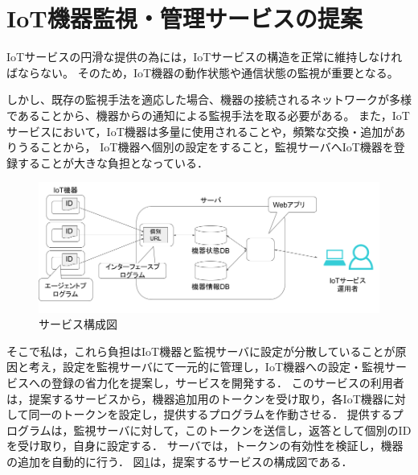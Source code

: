 \section{IoT機器監視・管理サービスの提案}
IoTサービスの円滑な提供の為には，IoTサービスの構造を正常に維持しなければならない。
そのため，IoT機器の動作状態や通信状態の監視が重要となる。

しかし、既存の監視手法を適応した場合、機器の接続されるネットワークが多様であることから、機器からの通知による監視手法を取る必要がある。
また，IoTサービスにおいて，IoT機器は多量に使用されることや，頻繁な交換・追加がありうることから，
IoT機器へ個別の設定をすること，監視サーバへIoT機器を登録することが大きな負担となっている．
\medskip

\begin{figure}[htbp]
\includegraphics[width=16cm]{images/prop_diag.png}
\caption{サービス構成図}
\label{fig:prop_diag}
\end{figure}
そこで私は，これら負担はIoT機器と監視サーバに設定が分散していることが原因と考え，設定を監視サーバにて一元的に管理し，IoT機器への設定・監視サービスへの登録の省力化を提案し，サービスを開発する．
このサービスの利用者は，提案するサービスから，機器追加用のトークンを受け取り，各IoT機器に対して同一のトークンを設定し，提供するプログラムを作動させる．
提供するプログラムは，監視サーバに対して，このトークンを送信し，返答として個別のIDを受け取り，自身に設定する．
サーバでは，トークンの有効性を検証し，機器の追加を自動的に行う．
図\ref{fig:prop_diag}は，提案するサービスの構成図である．
\newpage

